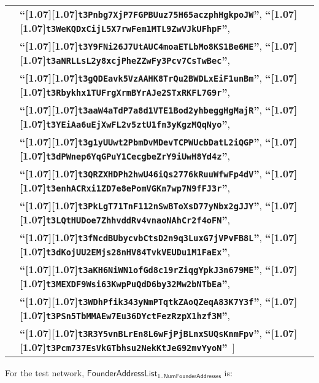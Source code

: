 \documentclass{article}
\let\oldtexttt\texttt
\renewcommand{\texttt}[1]{\scalebox{0.97}[1.07]{\oldtexttt{#1}}}
\newcommand{\introlist}{\needspace{15ex}}
\numberwithin{theorem}{subsection}
\newcommand{\ascii}[1]{\textbf{``\texttt{#1}''}}
\newcommand{\oneto}[1]{\mathrm{1}..{#1}}
\newcommand{\NumFounderAddresses}{\mathsf{NumFounderAddresses}}
\newcommand{\FounderAddressList}{\mathsf{FounderAddressList}}
\begin{document}
{\begin{tabular}{@{\hskip 2.5em}l@{\;}l}
 & \ascii{t3Pnbg7XjP7FGPBUuz75H65aczphHgkpoJW}, \ascii{t3WeKQDxCijL5X7rwFem1MTL9ZwVJkUFhpF}, \\
 & \ascii{t3Y9FNi26J7UtAUC4moaETLbMo8KS1Be6ME}, \ascii{t3aNRLLsL2y8xcjPheZZwFy3Pcv7CsTwBec}, \\
 & \ascii{t3gQDEavk5VzAAHK8TrQu2BWDLxEiF1unBm}, \ascii{t3Rbykhx1TUFrgXrmBYrAJe2STxRKFL7G9r}, \\
 & \ascii{t3aaW4aTdP7a8d1VTE1Bod2yhbeggHgMajR}, \ascii{t3YEiAa6uEjXwFL2v5ztU1fn3yKgzMQqNyo}, \\
 & \ascii{t3g1yUUwt2PbmDvMDevTCPWUcbDatL2iQGP}, \ascii{t3dPWnep6YqGPuY1CecgbeZrY9iUwH8Yd4z}, \\
 & \ascii{t3QRZXHDPh2hwU46iQs2776kRuuWfwFp4dV}, \ascii{t3enhACRxi1ZD7e8ePomVGKn7wp7N9fFJ3r}, \\
 & \ascii{t3PkLgT71TnF112nSwBToXsD77yNbx2gJJY}, \ascii{t3LQtHUDoe7ZhhvddRv4vnaoNAhCr2f4oFN}, \\
 & \ascii{t3fNcdBUbycvbCtsD2n9q3LuxG7jVPvFB8L}, \ascii{t3dKojUU2EMjs28nHV84TvkVEUDu1M1FaEx}, \\
 & \ascii{t3aKH6NiWN1ofGd8c19rZiqgYpkJ3n679ME}, \ascii{t3MEXDF9Wsi63KwpPuQdD6by32Mw2bNTbEa}, \\
 & \ascii{t3WDhPfik343yNmPTqtkZAoQZeqA83K7Y3f}, \ascii{t3PSn5TbMMAEw7Eu36DYctFezRzpX1hzf3M}, \\
 & \ascii{t3R3Y5vnBLrEn8L6wFjPjBLnxSUQsKnmFpv}, \ascii{t3Pcm737EsVkGTbhsu2NekKtJeG92mvYyoN}\, ]
\end{tabular}
} %

\vspace{1ex}
\introlist
For the test network, $\FounderAddressList_{\oneto{\NumFounderAddresses}}$ is:
\end{document}
